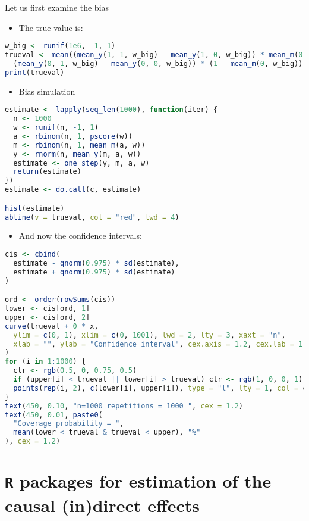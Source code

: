\documentclass[
  12pt,
]{book}
\providecommand{\tightlist}{%
  \setlength{\itemsep}{0pt}\setlength{\parskip}{0pt}}
\theoremstyle{definition}
\theoremstyle{definition}
\theoremstyle{definition}
\newcommand{\1}{\mathbbm{1}}
\begin{document}
Let us first examine the bias

\begin{itemize}
\tightlist
\item
  The true value is:
\end{itemize}

\begin{lstlisting}[language=R]
w_big <- runif(1e6, -1, 1)
trueval <- mean((mean_y(1, 1, w_big) - mean_y(1, 0, w_big)) * mean_m(0, w_big) +
  (mean_y(0, 1, w_big) - mean_y(0, 0, w_big)) * (1 - mean_m(0, w_big)))
print(trueval)
\end{lstlisting}

\begin{itemize}
\tightlist
\item
  Bias simulation
\end{itemize}

\begin{lstlisting}[language=R]
estimate <- lapply(seq_len(1000), function(iter) {
  n <- 1000
  w <- runif(n, -1, 1)
  a <- rbinom(n, 1, pscore(w))
  m <- rbinom(n, 1, mean_m(a, w))
  y <- rnorm(n, mean_y(m, a, w))
  estimate <- one_step(y, m, a, w)
  return(estimate)
})
estimate <- do.call(c, estimate)

hist(estimate)
abline(v = trueval, col = "red", lwd = 4)
\end{lstlisting}

\begin{itemize}
\tightlist
\item
  And now the confidence intervals:
\end{itemize}

\begin{lstlisting}[language=R]
cis <- cbind(
  estimate - qnorm(0.975) * sd(estimate),
  estimate + qnorm(0.975) * sd(estimate)
)

ord <- order(rowSums(cis))
lower <- cis[ord, 1]
upper <- cis[ord, 2]
curve(trueval + 0 * x,
  ylim = c(0, 1), xlim = c(0, 1001), lwd = 2, lty = 3, xaxt = "n",
  xlab = "", ylab = "Confidence interval", cex.axis = 1.2, cex.lab = 1.2
)
for (i in 1:1000) {
  clr <- rgb(0.5, 0, 0.75, 0.5)
  if (upper[i] < trueval || lower[i] > trueval) clr <- rgb(1, 0, 0, 1)
  points(rep(i, 2), c(lower[i], upper[i]), type = "l", lty = 1, col = clr)
}
text(450, 0.10, "n=1000 repetitions = 1000 ", cex = 1.2)
text(450, 0.01, paste0(
  "Coverage probability = ",
  mean(lower < trueval & trueval < upper), "%"
), cex = 1.2)
\end{lstlisting}

\hypertarget{r-packages-for-estimation-of-the-causal-indirect-effects}{%
\chapter{\texorpdfstring{\texttt{R} packages for estimation of the causal (in)direct effects}{R packages for estimation of the causal (in)direct effects}}\label{r-packages-for-estimation-of-the-causal-indirect-effects}}
\end{document}
